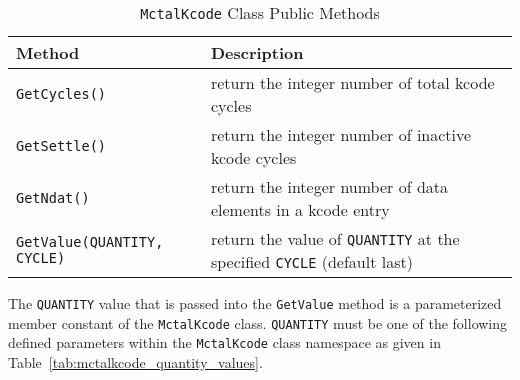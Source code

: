 \documentclass[11pt]{article}
\begin{document}
\begin{table}[]
  \begin{center}
  \caption{\texttt{MctalKcode} Class Public Methods}
  \label{tab:mctalkcode_class_public_methods}
    \begin{tabular}{lp{3.5in}}
      \toprule
        Method & Description \\
      \midrule
        \texttt{GetCycles()}               & return the integer number of total kcode cycles \\
        \texttt{GetSettle()}               & return the integer number of inactive kcode cycles \\
        \texttt{GetNdat()}                 & return the integer number of data elements in a kcode entry \\
        \texttt{GetValue(QUANTITY, CYCLE)} & return the value of \texttt{QUANTITY} at the specified \texttt{CYCLE} (default last) \\
      \bottomrule
    \end{tabular}
  \end{center}
\end{table}

The \texttt{QUANTITY} value that is passed into the \texttt{GetValue} method is
a parameterized member constant of the \texttt{MctalKcode} class.
\texttt{QUANTITY} must be one of the following defined parameters within the
\texttt{MctalKcode} class namespace as given in Table~\ref{tab:mctalkcode_quantity_values}.
\end{document}
